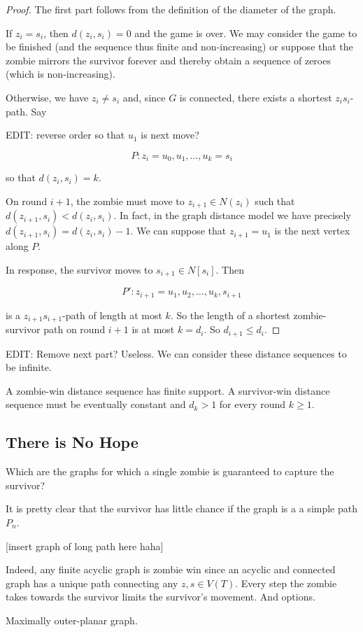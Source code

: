 \begin{proof}
The first part follows from the definition of the diameter of the graph.

If $z_i = s_i$, then $d(z_i, s_i) = 0$ and the game is over. We may consider the
game to be finished (and the sequence thus finite and non-increasing)
or suppose that the zombie mirrors the survivor forever and thereby obtain a sequence
of zeroes (which is non-increasing).

Otherwise, we have $z_i \not= s_i$ and, since $G$ is connected, there exists a shortest $z_is_i$-path. Say

EDIT: reverse order so that $u_1$ is next move?

\[ P : z_i = u_0, u_1, \dots, u_k = s_i \]

so that $d(z_i, s_i) = k$.

On round $i+1$, the zombie must move to $z_{i+1} \in N(z_i)$ such that $d(z_{i+1}, s_i) < d(z_i, s_i)$.
In fact, in the graph distance model we have precisely $d(z_{i+1}, s_i) = d(z_i, s_i) - 1$.
We can suppose that $z_{i+1} = u_1$ is the next vertex along $P$.

In response, the survivor moves to $s_{i+1} \in N[s_i]$. Then

\[ P' : z_{i+1} = u_1, u_2, \dots, u_k, s_{i+1} \]

is a $z_{i+1}s_{i+1}$-path of length at most $k$. So the length of a shortest zombie-survivor
path on round $i+1$ is at most $k = d_i$. So $d_{i+1} \leq d_i$.
\end{proof}


EDIT: Remove next part? Useless.
We can consider these distance sequences to be infinite.
\begin{corollary} A zombie-win distance sequence has finite support.
A survivor-win distance sequence must be eventually constant and $d_k > 1$
for every round $k \geq 1$.
\end{corollary}

\subsection{There is No Hope}
Which are the graphs for which a single zombie is guaranteed to capture the
survivor?

It is pretty clear that the survivor has little chance if the graph is a
a simple path $P_n$.

[insert graph of long path here haha]

Indeed, any finite acyclic graph is zombie win since an acyclic and connected graph
has a unique path connecting any $z, s \in V(T)$. Every step the zombie takes towards
the survivor limits the survivor's movement. And options.

Maximally outer-planar graph.

